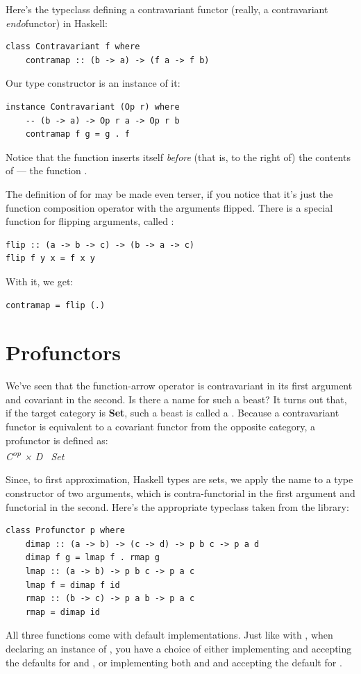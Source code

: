 \noindent
Here's the typeclass defining a contravariant functor (really, a
contravariant \emph{endo}functor) in Haskell:

\begin{verbatim}
class Contravariant f where
    contramap :: (b -> a) -> (f a -> f b)
\end{verbatim}
Our type constructor  is an instance of it:

\begin{verbatim}
instance Contravariant (Op r) where
    -- (b -> a) -> Op r a -> Op r b
    contramap f g = g . f
\end{verbatim}
Notice that the function  inserts itself \emph{before} (that
is, to the right of) the contents of  --- the function
.

The definition of  for  may be made even
terser, if you notice that it's just the function composition operator
with the arguments flipped. There is a special function for flipping
arguments, called :

\begin{verbatim}
flip :: (a -> b -> c) -> (b -> a -> c)
flip f y x = f x y
\end{verbatim}
With it, we get:

\begin{verbatim}
contramap = flip (.)
\end{verbatim}

\section{Profunctors}\label{profunctors}

We've seen that the function-arrow operator is contravariant in its
first argument and covariant in the second. Is there a name for such a
beast? It turns out that, if the target category is \textbf{Set}, such a
beast is called a . Because a contravariant functor is
equivalent to a covariant functor from the opposite category, a
profunctor is defined as:\\
\emph{C\textsuperscript{op} × D \to\ Set}

Since, to first approximation, Haskell types are sets, we apply the name
 to a type constructor  of two arguments,
which is contra-functorial in the first argument and functorial in the
second. Here's the appropriate typeclass taken from the
 library:

\begin{verbatim}
class Profunctor p where
    dimap :: (a -> b) -> (c -> d) -> p b c -> p a d
    dimap f g = lmap f . rmap g
    lmap :: (a -> b) -> p b c -> p a c
    lmap f = dimap f id
    rmap :: (b -> c) -> p a b -> p a c
    rmap = dimap id
\end{verbatim}
All three functions come with default implementations. Just like with
, when declaring an instance of ,
you have a choice of either implementing  and accepting
the defaults for  and , or implementing both
 and  and accepting the default for
.

